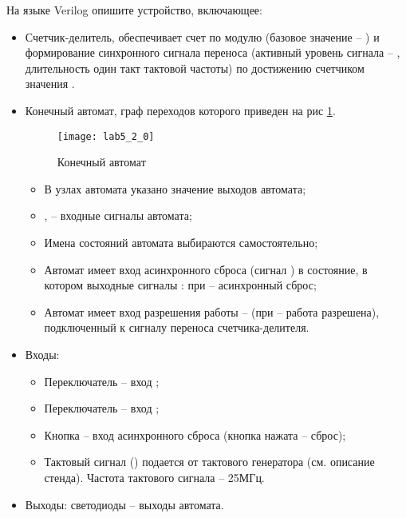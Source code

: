 На языке Verilog опишите устройство, включающее:
\begin{itemize}
	\item Счетчик-делитель, обеспечивает счет по модулю  (базовое значение -- ) и формирование синхронного сигнала переноса (активный уровень сигнала -- , длительность один такт тактовой частоты) по достижению счетчиком значения .
	\item Конечный автомат, граф переходов которого приведен на рис \ref{fig:lab5_2_0}.
		\vspace{-0.5cm}
		\begin{figure}[H]
		\begin{center}
			\texttt{[image: lab5\_2\_0]}
			\caption{Конечный автомат}
			\label{fig:lab5_2_0}
		\end{center}
		\end{figure}
		\vspace{-1cm}
		\begin{itemize}
			\item В узлах автомата указано значение выходов автомата;
			\item {},  – входные сигналы автомата;
			\item Имена состояний автомата выбираются самостоятельно;
			\item Автомат имеет вход асинхронного сброса (сигнал ) в состояние, в котором выходные сигналы : при  – асинхронный сброс;
			\item Автомат имеет вход разрешения работы --  (при  – работа разрешена), подключенный к сигналу переноса счетчика-делителя.
		\end{itemize}	
	\item Входы:
		\begin{itemize}
			\item Переключатель  -- вход ;
			\item Переключатель  – вход ;
			\item Кнопка  – вход асинхронного сброса (кнопка нажата -- сброс);
			\item Тактовый сигнал () подается от тактового генератора (см. описание стенда). Частота тактового сигнала – 25МГц.
		\end{itemize}		
	\item Выходы: светодиоды  -- выходы автомата.
\end{itemize}

